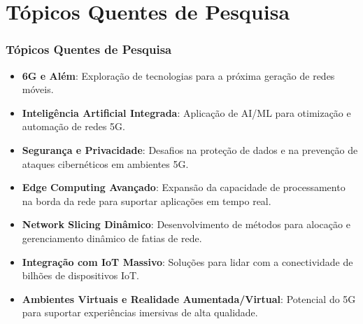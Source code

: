 \section{Tópicos Quentes de Pesquisa}
\begin{frame}[allowframebreaks]
    \frametitle{Tópicos Quentes de Pesquisa}
    \begin{itemize}
        \item \textbf{6G e Além}: Exploração de tecnologias para a próxima geração de redes móveis.
        \item \textbf{Inteligência Artificial Integrada}: Aplicação de AI/ML para otimização e automação de redes 5G.
        \item \textbf{Segurança e Privacidade}: Desafios na proteção de dados e na prevenção de ataques cibernéticos em ambientes 5G.
        \item \textbf{Edge Computing Avançado}: Expansão da capacidade de processamento na borda da rede para suportar aplicações em tempo real.
        \item \textbf{Network Slicing Dinâmico}: Desenvolvimento de métodos para alocação e gerenciamento dinâmico de fatias de rede.
        \item \textbf{Integração com IoT Massivo}: Soluções para lidar com a conectividade de bilhões de dispositivos IoT.
        \item \textbf{Ambientes Virtuais e Realidade Aumentada/Virtual}: Potencial do 5G para suportar experiências imersivas de alta qualidade.
    \end{itemize}
\end{frame}